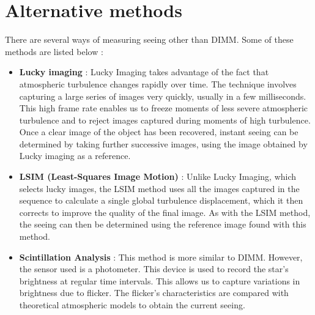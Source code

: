 \section{Alternative methods}
There are several ways of measuring seeing other than \Gls{DIMM}. Some of these methods are listed below :
\begin{itemize}
    \item \textbf{Lucky imaging} : Lucky Imaging takes advantage of the fact that atmospheric turbulence changes
          rapidly over time. The technique involves capturing a large series of images very quickly,
          usually in a few milliseconds. This high frame rate enables us to freeze moments of less severe atmospheric
          turbulence and to reject images captured during moments of high turbulence. Once a clear image of the object
          has been recovered, instant seeing can be determined by taking further successive images, using the image
          obtained by Lucky imaging as a reference.
    \item \textbf{LSIM (Least-Squares Image Motion)} : Unlike Lucky Imaging, which selects lucky images, the LSIM
          method uses all the images captured in the sequence to calculate a single global turbulence displacement,
          which it then corrects to improve the quality of the final image. As with the LSIM method, the seeing can then
          be determined using the reference image found with this method.
    \item \textbf{Scintillation Analysis} : This method is more similar to \Gls{DIMM}. However, the sensor used is a photometer.
          This device is used to record the star's brightness at regular time intervals. This allows us to capture variations
          in brightness due to flicker. The flicker's characteristics are compared with theoretical atmospheric models
          to obtain the current seeing.
\end{itemize}